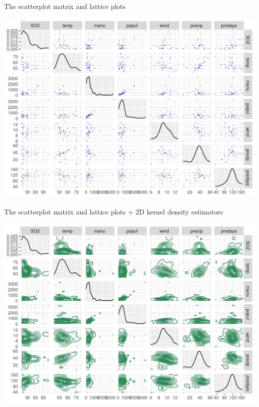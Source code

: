 \documentclass[11pt,handout,aspectratio=169]{beamer}
\begin{document}
\begin{frame}[fragile]{The scatterplot matrix and lattice plots}
\begin{center}
\includegraphics[width=.75\textwidth]{pics/plot1.4.pdf}		
\end{center}
\end{frame}



\begin{frame}[fragile]{The scatterplot matrix and lattice plots + 2D kernel density estimators}
\begin{center}
\includegraphics[width=.75\textwidth]{pics/plot1.6.pdf}		
\end{center}
\end{frame}
\end{document}
